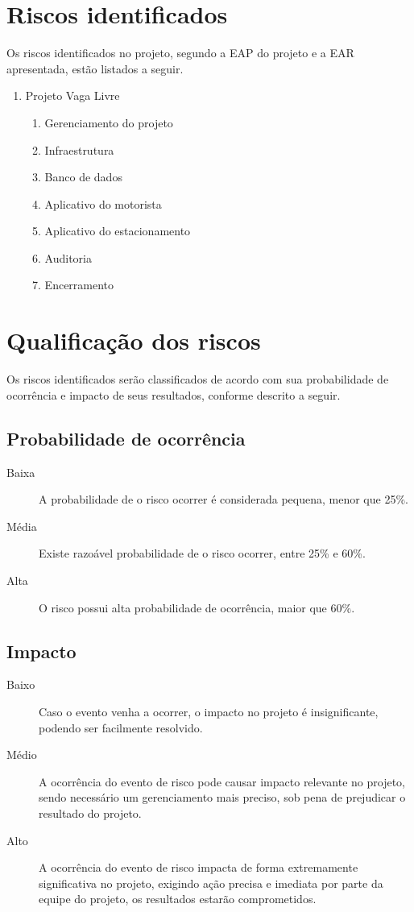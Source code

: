 \section{Riscos identificados}

Os riscos identificados no projeto, segundo a EAP do projeto e a EAR apresentada, estão listados a seguir.

\begin{enumerate}
\item Projeto Vaga Livre
\begin{enumerate}
\item Gerenciamento do projeto
\item Infraestrutura
\item Banco de dados
\item Aplicativo do motorista
\item Aplicativo do estacionamento
\item Auditoria
\item Encerramento
\end{enumerate}
\end{enumerate}

\section{Qualificação dos riscos}

Os riscos identificados serão classificados de acordo com sua probabilidade de ocorrência e impacto de seus resultados, conforme descrito a seguir.

\subsection{Probabilidade de ocorrência}

\begin{description}
\item [Baixa] A probabilidade de o risco ocorrer é considerada pequena, menor que 25\%.
\item [Média] Existe razoável probabilidade de o risco ocorrer, entre 25\% e 60\%.
\item [Alta] O risco possui alta probabilidade de ocorrência, maior que 60\%. 
\end{description}

\subsection{Impacto}

\begin{description}
\item [Baixo] Caso o evento venha a ocorrer, o impacto no projeto é insignificante, podendo ser facilmente resolvido.
\item [Médio] A ocorrência do evento de risco pode causar impacto relevante no projeto, sendo necessário um gerenciamento mais preciso, sob pena de prejudicar o resultado do projeto.
\item [Alto] A ocorrência do evento de risco impacta de forma extremamente significativa no projeto, exigindo ação precisa e imediata por parte da equipe do projeto, os resultados estarão comprometidos.
\end{description}

